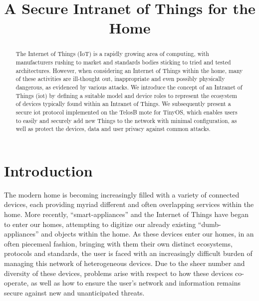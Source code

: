 \documentclass[conference]{./sty/IEEEtran}
\begin{document}
%
\title{A Secure Intranet of Things for the Home}


\author{
}

\maketitle


\begin{abstract}
The Internet of Things (IoT) is a rapidly growing area of computing, with manufacturers rushing to market and standards bodies sticking to tried and tested architectures. However, when considering an Internet of Things within the home, many of these activities are ill-thought out, inappropriate and even possibly physically dangerous, as evidenced by various attacks\cite{BelkinWemo,IoTWorm}. We introduce the concept of an Intranet of Things (iot) by defining a suitable model and device roles to represent the ecosystem of devices typically found within an Intranet of Things. We subsequently present a secure iot protocol implemented on the TelosB mote for TinyOS, which enables users to easily and securely add new Things to the network with minimal configuration, as well as protect the devices, data and user privacy against common attacks. 
\end{abstract}


\section{Introduction}
The modern home is becoming increasingly filled with a variety of connected devices, each providing myriad different and often overlapping services within the home. More recently, ``smart-appliances'' and the Internet of Things have began to enter our homes, attempting to digitize our already existing ``dumb-appliances'' and objects within the home. As these devices enter our homes, in an often piecemeal fashion, bringing with them their own distinct ecosystems, protocols and standards, the user is faced with an increasingly difficult burden of managing this network of heterogeneous devices. Due to the sheer number and diversity of these devices, problems arise with respect to how these devices co-operate, as well as how to ensure the user's network and information remains secure against new and unanticipated threats.
\end{document}
